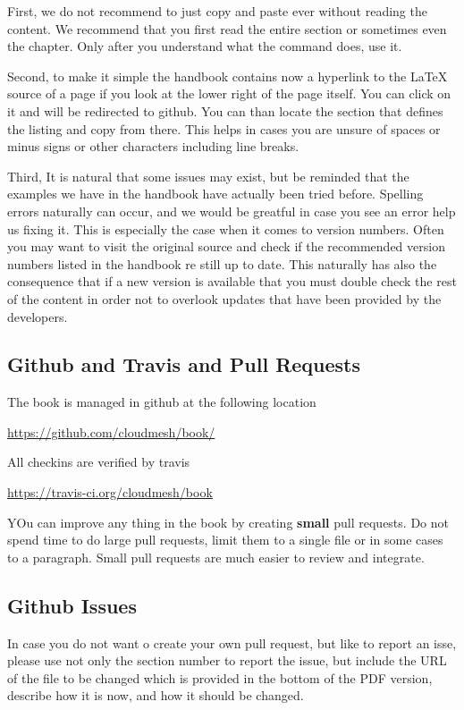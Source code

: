 First, we do not recommend to just copy and paste ever without reading
the content. We recommend that you first read the entire section or
sometimes even the chapter. Only after you understand what the command
does, use it.

Second, to make it simple the handbook contains now a hyperlink to the
LaTeX source of a page if you look at the lower right of the page
itself. You can click on it and will be redirected to github. You can
than locate the section that defines the listing and copy from
there. This helps in cases you are unsure of spaces or minus signs or
other characters including line breaks.

Third, It is natural that some issues may exist, but be reminded that
the examples we have in the handbook have actually been tried
before. Spelling errors naturally can occur, and we would be greatful
in case you see an error help us fixing it. This is especially the case
when it comes to version numbers. Often you may want to visit the
original source and check if the recommended version numbers listed in
the handbook re still up to date. This naturally has also the
consequence that if a new version is available that you must double
check the rest of the content in order not to overlook updates that
have been provided by the developers.

\subsection{Github and Travis and Pull Requests}

The book is managed in github at the following location

\url{https://github.com/cloudmesh/book/}

All checkins are verified by travis

\url{https://travis-ci.org/cloudmesh/book}

YOu can improve any thing in the book by creating {\bf small} pull
requests. Do not spend time to do large pull requests, limit them to a
single file or in some cases to a paragraph. Small pull requests are
much easier to review and integrate.

\subsection{Github Issues}

In case you do not want o create your own pull request, but like to
report an isse, please use not only the section number to report the
issue, but include the URL of the file to be changed which is provided
in the bottom of the PDF version, describe how it is now, and how it
should be changed.

